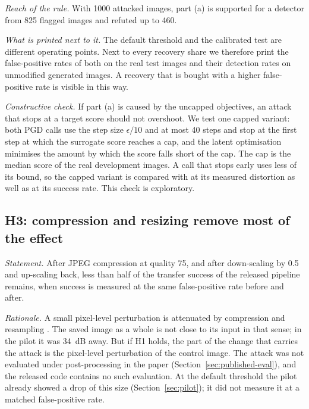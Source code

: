 \emph{Reach of the rule.} With 1000 attacked images, part (a) is supported for a detector from 825
flagged images and refuted up to 460.

\emph{What is printed next to it.} The default threshold and the calibrated test are different
operating points. Next to every recovery share we therefore print the false-positive rates of both
on the real test images and their detection rates on unmodified generated images. A recovery that
is bought with a higher false-positive rate is visible in this way.

\emph{Constructive check.} If part (a) is caused by the uncapped objectives, an attack that stops
at a target score should not overshoot. We test one capped variant: both PGD calls use the step
size $\epsilon/10$ and at most 40 steps and stop at the first step at which the surrogate score
reaches a cap, and the latent optimisation minimises the amount by which the score falls short of
the cap. The cap is the median score of the real development images.  A call that stops early uses less of its bound, so
the capped variant is compared with  at its measured distortion as well as at its success
rate. This check is exploratory.

\subsection{H3: compression and resizing remove most of the effect}
\label{sec:h3}

\emph{Statement.} After JPEG compression at quality 75, and after down-scaling by 0.5 and
up-scaling back, less than half of the transfer success of the released pipeline remains, when
success is measured at the same false-positive rate before and after.

\emph{Rationale.} A small pixel-level perturbation is attenuated by compression and resampling
. The saved image as a whole is not close to its input in
that sense; in the pilot it was 34~dB away. But if H1 holds, the part of the change that carries
the attack is the pixel-level perturbation of the control image. The attack was not evaluated under
post-processing in the paper (Section~\ref{sec:published-eval}), and the released code contains no
such evaluation. At the default threshold the pilot already showed a drop of this size
(Section~\ref{sec:pilot}); it did not measure it at a matched false-positive rate.

